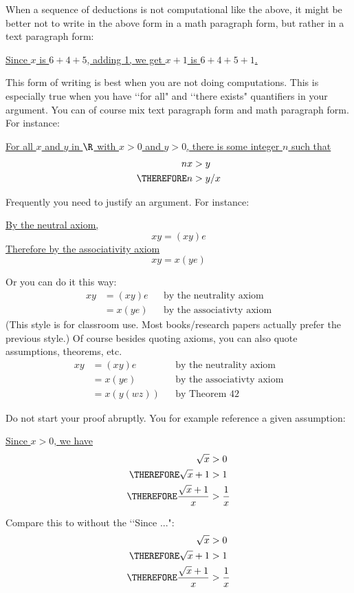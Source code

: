 When a sequence of deductions is not computational like the above,
it might be better not to write in the above form in a math paragraph
form, but rather in a text paragraph form:

\underline{Since $x$ is $6+4+5$, adding 1, we get $x + 1$ is $6+4+5+1$.}

This form of writing is best when you are not doing computations.
This is especially true when you have \lq\lq for all" and \lq\lq there exists"
quantifiers in your argument.
You can of course mix text paragraph form and math paragraph form.
For instance:

\underline{For all $x$ and $y$ in $\R$ with $x > 0$ and $y > 0$, there is some
integer $n$ such that}
\begin{align*}
           nx &> y \\
\THEREFORE n  &> y/x
\end{align*} 

Frequently you need to justify an argument.
For instance:

\underline{By the neutral axiom,}
\[
xy = (xy)e
\]
\underline{Therefore by the associativity axiom}
\[
xy = x(ye)
\]

Or you can do it this way:
\begin{align*}
xy &= (xy)e     & &\text{by the neutrality axiom}   \\
   &= x(ye)     & &\text{by the associativty axiom}
\end{align*}
(This style is for classroom use. Most books/research papers actually
prefer the previous style.)
Of course besides quoting axioms, you can also quote assumptions, theorems,
etc.
\begin{align*}
xy &= (xy)e     & &\text{by the neutrality axiom}   \\
   &= x(ye)     & &\text{by the associativty axiom} \\
   &= x(y(wz))  & &\text{by Theorem 42}
\end{align*}

Do not start your proof abruptly.
You for example reference a given assumption:

\underline{Since $x > 0$, we have}
\begin{align*}
           \sqrt{x}     &> 0 \\
\THEREFORE \sqrt{x} + 1 &> 1 \\
\THEREFORE \frac{\sqrt{x} + 1}{x} &> \frac{1}{x}
\end{align*}

Compare this to without the \lq\lq Since ...":
\begin{align*}
           \sqrt{x}     &> 0 \\
\THEREFORE \sqrt{x} + 1 &> 1 \\
\THEREFORE \frac{\sqrt{x} + 1}{x} &> \frac{1}{x}
\end{align*}

